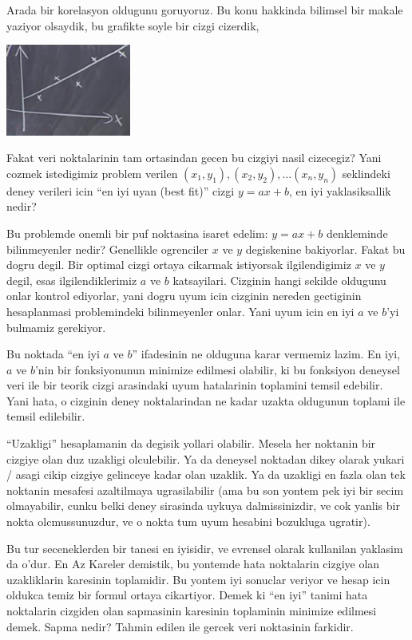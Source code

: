 \documentclass[12pt,fleqn]{article}\usepackage{../common}
\begin{document}
Arada bir korelasyon oldugunu goruyoruz. Bu konu hakkinda bilimsel bir
makale yaziyor olsaydik, bu grafikte soyle bir cizgi cizerdik, 

\includegraphics[height=3cm]{9_6.png}

Fakat veri noktalarinin tam ortasindan gecen bu cizgiyi nasil cizecegiz?
Yani cozmek istedigimiz problem verilen $(x_1,y_1), (x_2,y_2),...(x_n,y_n)$
seklindeki deney verileri icin ``en iyi uyan (best fit)'' cizgi $y=ax + b$,
en iyi yaklasiksallik nedir? 

Bu problemde onemli bir puf noktasina isaret edelim: $y=ax + b$ denkleminde
bilinmeyenler nedir? Genellikle ogrenciler $x$ ve $y$ degiskenine
bakiyorlar. Fakat bu dogru degil. Bir optimal cizgi ortaya cikarmak
istiyorsak ilgilendigimiz $x$ ve $y$ degil, esas ilgilendiklerimiz $a$ ve
$b$ katsayilari. Cizginin hangi sekilde oldugunu onlar kontrol ediyorlar,
yani dogru uyum icin cizginin nereden gectiginin hesaplanmasi problemindeki
bilinmeyenler onlar. Yani uyum icin en iyi $a$ ve $b$'yi bulmamiz
gerekiyor.

Bu noktada ``en iyi $a$ ve $b$'' ifadesinin ne olduguna karar vermemiz
lazim. En iyi, $a$ ve $b$'nin bir fonksiyonunun minimize edilmesi olabilir,
ki bu fonksiyon deneysel veri ile bir teorik cizgi arasindaki uyum
hatalarinin toplamini temsil edebilir. Yani hata, o cizginin deney
noktalarindan ne kadar uzakta oldugunun toplami ile temsil edilebilir.

``Uzakligi'' hesaplamanin da degisik yollari olabilir. Mesela her noktanin
bir cizgiye olan duz uzakligi olculebilir. Ya da deneysel noktadan dikey
olarak yukari / asagi cikip cizgiye gelinceye kadar olan uzaklik. Ya da
uzakligi en fazla olan tek noktanin mesafesi azaltilmaya ugrasilabilir (ama
bu son yontem pek iyi bir secim olmayabilir, cunku belki deney sirasinda
uykuya dalmissinizdir, ve cok yanlis bir nokta olcmussunuzdur, ve o nokta
tum uyum hesabini bozukluga ugratir).

Bu tur seceneklerden bir tanesi en iyisidir, ve evrensel olarak kullanilan
yaklasim da o'dur. En Az Kareler demistik, bu yontemde hata noktalarin
cizgiye olan uzakliklarin karesinin toplamidir. Bu yontem iyi sonuclar
veriyor ve hesap icin oldukca temiz bir formul ortaya cikartiyor. Demek ki
``en iyi'' tanimi hata noktalarin cizgiden olan sapmasinin karesinin
toplaminin minimize edilmesi demek. Sapma nedir? Tahmin edilen ile gercek
veri noktasinin farkidir. 
\end{document}
